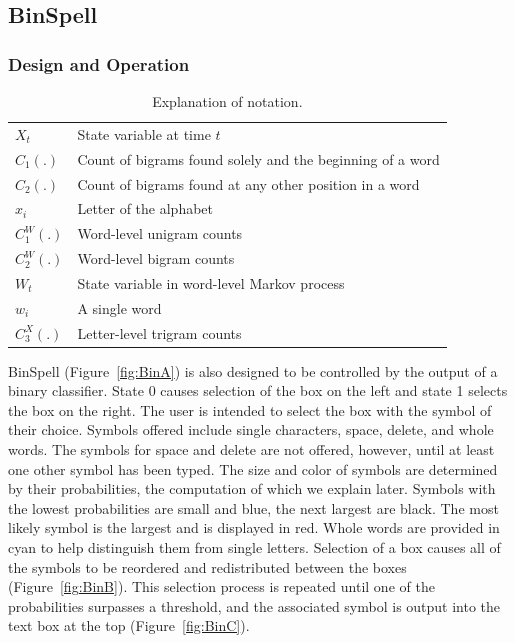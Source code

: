 \documentclass[12pt,titlepage]{article}
\begin{document}
\subsection{BinSpell}

\subsubsection{Design and Operation}

\begin{table}
\caption{Explanation of notation.}
\begin{center}
\begin{tabular}{ll}
\hline\hline
$X_t$ & State variable at time $t$ \\
$C_1(.)$ & Count of bigrams found solely and the beginning of a word \\
$C_2(.)$ & Count of bigrams found at any other position in a word \\
$x_i$ & Letter of the alphabet \\
$C_1^W(.)$ & Word-level unigram counts \\
$C_2^W(.)$ & Word-level bigram counts \\
$W_t$ & State variable in word-level Markov process \\
$w_i$ & A single word \\
$C_3^X(.)$ & Letter-level trigram counts \\
\hline\hline
\end{tabular}
\end{center}
\label{table:Not}
\end{table}

BinSpell (Figure~\ref{fig:BinA}) is also designed to be controlled by the output of a binary classifier.  State 0 causes 
selection of the box on the left and state 1 selects the box on the right.  The user is intended to select the 
box with the symbol of their choice.  Symbols offered include single characters, space, delete, and 
whole words.  The symbols for space and delete are not offered, however, until at least one other 
symbol has been typed.  The size and color of symbols are determined by their probabilities, the 
computation of which we explain later.  Symbols with the lowest probabilities are small and blue, the 
next largest are black.  The most likely symbol is the largest and is displayed in red.  Whole words are 
provided in cyan to help distinguish them from single letters.  Selection of a box causes all of the 
symbols to be reordered and redistributed between the boxes (Figure~\ref{fig:BinB}).  This selection process is repeated 
until one of the probabilities surpasses a threshold, and the associated symbol is output into the text box 
at the top (Figure~\ref{fig:BinC}). 
\end{document}
